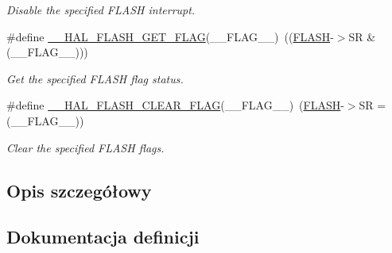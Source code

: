 \begin{DoxyCompactItemize}
\begin{DoxyCompactList}\small\item\em Disable the specified F\+L\+A\+SH interrupt. \end{DoxyCompactList}\item 
\#define \hyperlink{group___f_l_a_s_h___exported___macros_ga0d3dd161fecc0e47c9e109c7c28672c1}{\+\_\+\+\_\+\+H\+A\+L\+\_\+\+F\+L\+A\+S\+H\+\_\+\+G\+E\+T\+\_\+\+F\+L\+AG}(\+\_\+\+\_\+\+F\+L\+A\+G\+\_\+\+\_\+)~((\hyperlink{group___peripheral__declaration_ga844ea28ba1e0a5a0e497f16b61ea306b}{F\+L\+A\+SH}-\/$>$SR \& (\+\_\+\+\_\+\+F\+L\+A\+G\+\_\+\+\_\+)))
\begin{DoxyCompactList}\small\item\em Get the specified F\+L\+A\+SH flag status. \end{DoxyCompactList}\item 
\#define \hyperlink{group___f_l_a_s_h___exported___macros_ga68e49c4675761e2ec35153e747de7622}{\+\_\+\+\_\+\+H\+A\+L\+\_\+\+F\+L\+A\+S\+H\+\_\+\+C\+L\+E\+A\+R\+\_\+\+F\+L\+AG}(\+\_\+\+\_\+\+F\+L\+A\+G\+\_\+\+\_\+)~(\hyperlink{group___peripheral__declaration_ga844ea28ba1e0a5a0e497f16b61ea306b}{F\+L\+A\+SH}-\/$>$SR = (\+\_\+\+\_\+\+F\+L\+A\+G\+\_\+\+\_\+))
\begin{DoxyCompactList}\small\item\em Clear the specified F\+L\+A\+SH flags. \end{DoxyCompactList}\end{DoxyCompactItemize}


\subsection{Opis szczegółowy}


\subsection{Dokumentacja definicji}
\mbox{\label{group___f_l_a_s_h___exported___macros_ga68e49c4675761e2ec35153e747de7622}} 

